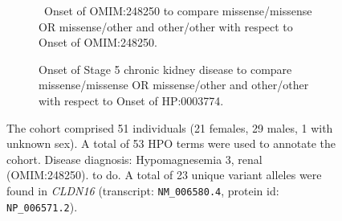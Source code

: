 \begin{figure}[htbp]
\vspace{2em}

\begin{subfigure}[b]{0.95\textwidth}
\captionsetup{justification=raggedright,singlelinecheck=false}
\caption{ Onset of OMIM:248250 to compare missense/missense OR missense/other and other/other with respect to Onset of OMIM:248250. }
\end{subfigure}

\vspace{2em}

\begin{subfigure}[b]{0.95\textwidth}
\captionsetup{justification=raggedright,singlelinecheck=false}
\caption{Onset of Stage 5 chronic kidney disease to compare missense/missense OR missense/other and other/other with respect to Onset of HP:0003774. }
\end{subfigure}

\vspace{2em}

\caption{ The cohort comprised 51 individuals (21 females, 29 males, 1 with unknown sex). A total of 53 HPO terms were used to annotate the cohort. Disease diagnosis: Hypomagnesemia 3, renal (OMIM:248250). to do. A total of 23 unique variant alleles were found in \textit{CLDN16} (transcript: \texttt{NM\_006580.4}, protein id: \texttt{NP\_006571.2}).}
\end{figure}
